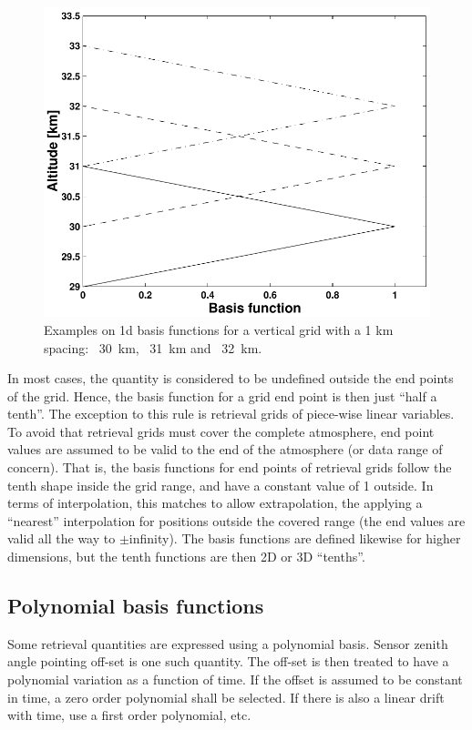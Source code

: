 \begin{figure}[t]
 \begin{center}
  \includegraphics*[width=0.7\hsize]{fig_absbasis_z}
  \caption{Examples on 1d basis functions for a vertical grid with a 1 km
           spacing: \lsolid~30~km, \ldashed~31~km and \ldashdot~32~km.}
  \label{fig:wfuns:zbasis}  
 \end{center}
\end{figure}

In most cases, the quantity is considered to be undefined outside the end
points of the grid. Hence, the basis function for a grid end point is then just
``half a tenth''. The exception to this rule is retrieval grids of piece-wise
linear variables. To avoid that retrieval grids must cover the complete
atmosphere, end point values are assumed to be valid to the end of the
atmosphere (or data range of concern). That is, the basis functions for end
points of retrieval grids follow the tenth shape inside the grid range, and
have a constant value of 1 outside. In terms of interpolation, this matches to
allow extrapolation, the applying a ``nearest'' interpolation for positions
outside the covered range (the end values are valid all the way to
$\pm$infinity).
The basis functions are defined likewise for higher dimensions, but the
tenth functions are then 2D or 3D ``tenths''.




\subsection{Polynomial basis functions}
\label{sec:wfuns:basis2}
%
Some retrieval quantities are expressed using a polynomial basis. Sensor zenith
angle pointing off-set is one such quantity. The off-set is then treated to
have a polynomial variation as a function of time. If the offset is assumed to
be constant in time, a zero order polynomial shall be selected. If there is
also a linear drift with time, use a first order polynomial, etc.

